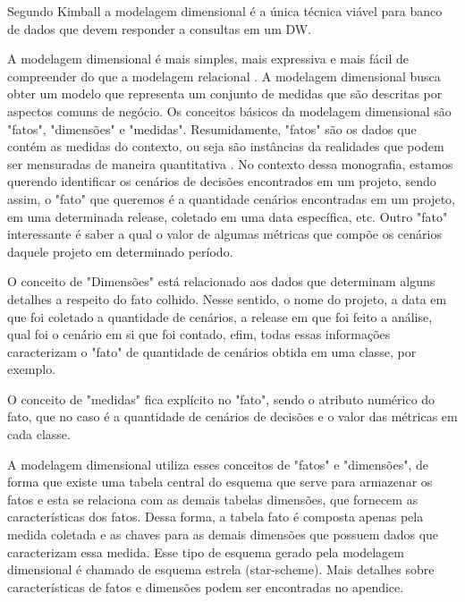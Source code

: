 Segundo Kimball \citeyear{kimball2002} a modelagem dimensional é a única técnica viável para banco de dados  que devem responder a consultas em um DW.

A modelagem dimensional é mais simples, mais expressiva e mais fácil de compreender do que a modelagem relacional \cite{ballard1998}. A modelagem dimensional busca obter um modelo que representa um conjunto de medidas que são descritas por aspectos comuns de negócio.
%
Os conceitos básicos da modelagem dimensional são "fatos", "dimensões" e "medidas". Resumidamente, "fatos" são os dados que contém as medidas do contexto, ou seja são instâncias da realidades que podem ser mensuradas de maneira quantitativa \cite{kimball2002}. No contexto dessa monografia, estamos querendo identificar os cenários de decisões encontrados em um projeto, sendo assim, o "fato" que queremos é a quantidade cenários encontradas em um projeto, em uma determinada release, coletado em uma data específica, etc. Outro "fato" interessante é saber a qual o valor de algumas métricas que compõe os cenários daquele projeto em determinado período. 

O conceito de "Dimensões" está relacionado aos dados que determinam alguns detalhes a respeito do fato colhido. Nesse sentido, o nome do projeto, a data em que foi coletado a quantidade de cenários, a release em que foi feito a análise, qual foi o cenário em si que foi contado, efim, todas essas informações caracterizam o "fato" de quantidade de cenários obtida em uma classe, por exemplo.  


O conceito de "medidas" fica explícito no "fato", sendo o atributo numérico do fato, que no caso é a quantidade de cenários de decisões e o valor das métricas em cada classe. 


A modelagem dimensional utiliza esses conceitos de "fatos" e "dimensões", de forma que existe uma tabela central do esquema que serve para armazenar os fatos e esta se relaciona com as demais tabelas dimensões, que fornecem as características dos fatos. Dessa forma, a tabela fato é composta apenas pela medida coletada e as chaves para as demais dimensões que possuem dados que caracterizam essa medida. Esse tipo de esquema gerado pela modelagem dimensional é chamado de esquema estrela (star-scheme). Mais detalhes sobre características de fatos e dimensões podem ser encontradas no apendice.



